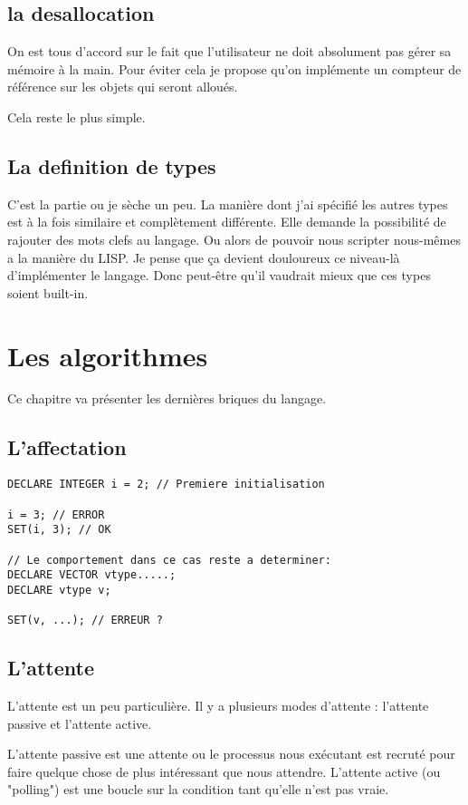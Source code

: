 \documentclass[french]{rtxreport}
\begin{document}
\section{la desallocation}
On est tous d’accord sur le fait que l’utilisateur ne doit absolument pas gérer sa mémoire à la main. Pour éviter cela je propose qu’on implémente un compteur de référence sur les objets qui seront alloués.

Cela reste le plus simple.

\section{La definition de types}
C’est la partie ou je sèche un peu. La manière dont j’ai spécifié les autres types est à la fois similaire et complètement différente. Elle demande la possibilité de rajouter des mots clefs au langage. Ou alors de pouvoir nous scripter nous-mêmes a la manière du LISP. Je pense que ça devient douloureux ce niveau-là d’implémenter le langage. Donc peut-être qu’il vaudrait mieux que ces types soient built-in.

\chapter{Les algorithmes}

Ce chapitre va présenter les dernières briques du langage.

\section{L'affectation}
\begin{lstlisting}
DECLARE INTEGER i = 2; // Premiere initialisation

i = 3; // ERROR
SET(i, 3); // OK

// Le comportement dans ce cas reste a determiner:
DECLARE VECTOR vtype.....;
DECLARE vtype v;

SET(v, ...); // ERREUR ?
\end{lstlisting}

\section{L'attente}

L’attente est un peu particulière. Il y a plusieurs modes d’attente : l’attente passive et l’attente active.

L’attente passive est une attente ou le processus nous exécutant est recruté pour faire quelque chose de plus intéressant que nous attendre. L’attente active (ou "polling") est une boucle sur la condition tant qu’elle n’est pas vraie.
\end{document}
